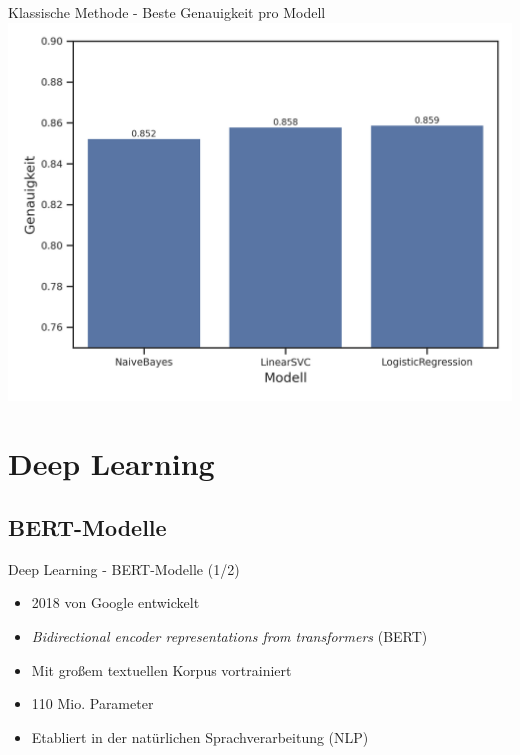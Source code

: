 \documentclass[aspectratio=169]{beamer}
\begin{document}
\begin{frame}{Klassische Methode - Beste Genauigkeit pro Modell}
	\centering
	\includegraphics[scale=0.65]{../datasets/sentiment140/results/plots/klassische-ml-beste-genauigkeit-pro-modell-truncated-y-axis.png}
\end{frame}


\section{Deep Learning}


\subsection{BERT-Modelle}

\begin{frame}{Deep Learning - BERT-Modelle (1/2)}
	\begin{itemize}
		\item 2018 von Google entwickelt
		\item \textit{Bidirectional encoder representations from transformers} (BERT)
		\item Mit großem textuellen Korpus vortrainiert
		\item 110 Mio. Parameter
		\item Etabliert in der natürlichen Sprachverarbeitung (NLP)
	\end{itemize}
\end{frame}
\end{document}
